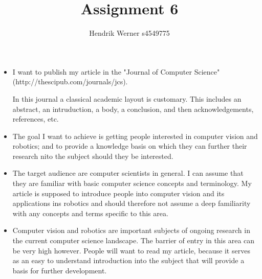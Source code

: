 \documentclass[12pt, a4paper]{article}
\title{Assignment 6}
\author{Hendrik Werner s4549775}
\begin{document}
\maketitle

\begin{itemize}
	\item I want to publish my article in the "Journal of Computer Science" (http://thescipub.com/journals/jcs).

	In this journal a classical academic layout is customary. This includes an abstract, an intruduction, a body, a conclusion, and then acknowledgements, references, etc.
	\item The goal I want to achieve is getting people interested in computer vision and robotics; and to provide a knowledge basis on which they can further their research nito the subject should they be interested.
	\item The target audience are computer scientists in general. I can assume that they are familiar with basic computer science concepts and terminology. My article is supposed to introduce people into computer vision and its applications ins robotics and should therefore not assume a deep familiarity with any concepts and terms specific to this area.
	\item Computer vision and robotics are important subjects of ongoing research in the current computer science landscape. The barrier of entry in this area can be very high however. People will want to read my article, because it serves as an easy to understand introduction into the subject that will provide a basis for further development.
\end{itemize}
\end{document}
